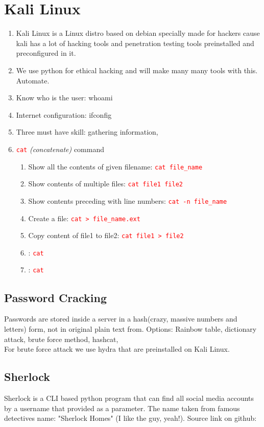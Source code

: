 \documentclass[12 pt, letterpaper]{extarticle}
\newcommand{\R}{\textcolor{red}} %
\newcommand{\T}{\texttt}
\begin{document}
\section*{Kali Linux}
\begin{enumerate}
	\item Kali Linux is a Linux distro based on debian specially made for hackers cause kali has a lot of hacking tools and penetration testing tools preinstalled and preconfigured in it.
	\item We use python for ethical hacking and will make many many tools with this. Automate.
	\item Know who is the user: whoami
	\item Internet configuration: ifconfig
	\item Three must have skill: gathering information, 	
	
	\item \R{\T{cat}} \textit{(concatenate)} command
		\begin{enumerate}
			\item Show all the contents of given  filename: \R{\T{cat file\_name}}
			\item Show contents of multiple files: \R{\T{cat file1 file2}}
			\item Show contents preceding with line numbers: \R{\T{cat -n file\_name}}
			\item Create a file: \R{\T{cat > file\_name.ext}}
			\item Copy content of file1 to file2: \R{\T{cat file1 > file2}}
			\item : \R{\T{cat }}
			\item : \R{\T{cat }}
		\end{enumerate}
\end{enumerate}

\subsection{Password Cracking}
Passwords are stored inside a server in a hash(crazy, massive numbers and letters) form, not in original plain text from.
Options: Rainbow table, dictionary attack, brute force method, hashcat, \\
For brute force attack we use hydra that are preinstalled on Kali Linux.

\subsection*{Sherlock}
Sherlock is a CLI based python program that can find all social media accounts by a username that provided as a parameter. The name taken from famous detectives name: "Sherlock Homes" (I like the guy, yeah!). Source link on github: %
\end{document}
